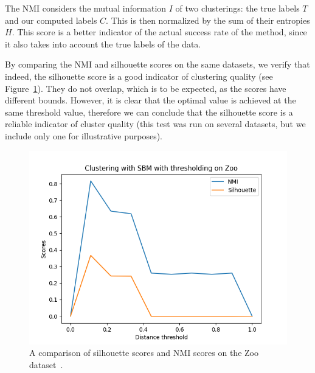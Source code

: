 \documentclass[conference]{IEEEtran}
\begin{document}
The NMI considers the mutual information $I$ of two clusterings: the true labels $T$ and our computed labels $C$. This is then normalized by the sum of their entropies $H$.  This score is a better indicator of the actual success rate of the method, since it also takes into account the true labels of the data.

By comparing the NMI and silhouette scores on the same datasets, we verify that indeed, the silhouette score is a good indicator of clustering quality (see Figure~\ref{fig:threshold_sbm_iris_nmi_slh}). They do not overlap, which is to be expected, as the scores have different bounds. However, it is clear that the optimal value is achieved at the same threshold value, therefore we can conclude that the silhouette score is a reliable indicator of cluster quality (this test was run on several datasets, but we include only one for illustrative purposes).

\begin{figure}[ht]
    \centering
    \includegraphics[width=0.9\columnwidth]{results/threshold_clustering_zoo.png}
    \caption{A comparison of silhouette scores and NMI scores on the Zoo dataset~\cite{Lichman:2013}.}
    \label{fig:threshold_sbm_iris_nmi_slh}
\end{figure}


\end{document}
